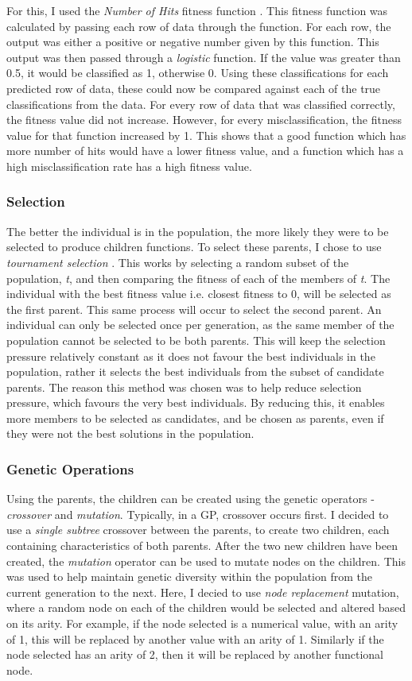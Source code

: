 \documentclass[11pt]{article}
\begin{document}
For this, I used the \textit{Number of Hits} fitness function \cite{ref-twelve} . This fitness function was calculated by passing each row of data through the function. For each row, the output was either a positive or negative number given by this function. This output was then passed through a \textit{logistic} function. If the value was greater than 0.5, it would be classified as 1, otherwise 0. Using these classifications for each predicted row of data, these could now be compared against each of the true classifications from the data. For every row of data that was classified correctly, the fitness value did not increase. However, for every misclassification, the fitness value for that function increased by 1. This shows that a good function which has more number of hits would have a lower fitness value, and a function which has a high misclassification rate has a high fitness value. 
\subsubsection{Selection}\label{subsubsec:selection}
The better the individual is in the population, the more likely they were to be selected to produce children functions. To select these parents, I chose to use \textit{tournament selection} \cite{ref-book}. This works by selecting a random subset of the population, \textit{t}, and then comparing the fitness of each of the members of \textit{t}. The individual with the best fitness value i.e. closest fitness to 0, will be selected as the first parent. This same process will occur to select the second parent. An individual can only be selected once per generation, as the same member of the population cannot be selected to be both parents. This will keep the selection pressure relatively constant as it does not favour the best individuals in the population, rather it selects the best individuals from the subset of candidate parents. The reason this method was chosen was to help reduce selection pressure, which favours the very best individuals. By reducing this, it enables more members to be selected as candidates, and be chosen as parents, even if they were not the best solutions in the population. 
\subsubsection{Genetic Operations}\label{subsubsec:GO}
Using the parents, the children can be created using the genetic operators - \textit{crossover} and \textit{mutation}. Typically, in a GP, crossover occurs first. I decided to use a \textit{single subtree} crossover between the parents, to create two children, each containing characteristics of both parents.
After the two new children have been created, the \textit{mutation} operator can be used to mutate nodes on the children. This was used to help maintain genetic diversity within the population from the current generation to the next. Here, I decied to use \textit{node replacement} mutation, where a random node on each of the children would be selected and altered based on its arity. For example, if the node selected is a numerical value, with an arity of 1, this will be replaced by another value with an arity of 1. Similarly if the node selected has an arity of 2, then it will be replaced by another functional node.
\end{document}
